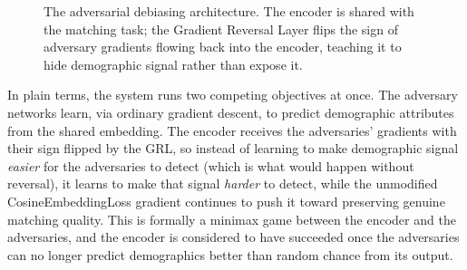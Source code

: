 \documentclass[11pt,a4paper]{article}
\begin{document}
\begin{figure}[H]
\centering
{}
\caption{The adversarial debiasing architecture. The encoder is shared with the matching task; the Gradient Reversal Layer flips the sign of adversary gradients flowing back into the encoder, teaching it to hide demographic signal rather than expose it.}
\label{fig:mod1-grl}
\end{figure}

In plain terms, the system runs two competing objectives at once. The adversary networks learn, via ordinary gradient descent, to predict demographic attributes from the shared embedding. The encoder receives the adversaries' gradients with their sign flipped by the GRL, so instead of learning to make demographic signal \emph{easier} for the adversaries to detect (which is what would happen without reversal), it learns to make that signal \emph{harder} to detect, while the unmodified CosineEmbeddingLoss gradient continues to push it toward preserving genuine matching quality. This is formally a minimax game between the encoder and the adversaries, and the encoder is considered to have succeeded once the adversaries can no longer predict demographics better than random chance from its output.
\end{document}
